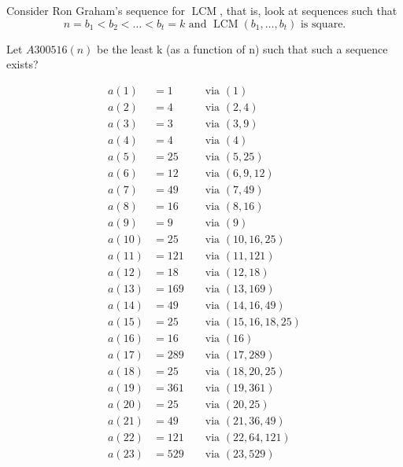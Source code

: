 \documentclass{article}
\begin{document}
Consider Ron Graham's sequence for $\operatorname{LCM}$, that is, look at sequences such that \[
  n = b_1 < b_2 < \hdots < b_t = k \text{ and } \operatorname{LCM}(b_1,\hdots,b_t) \text{ is square.}
\]
\begin{question}
  Let $A300516(n)$ be the least k (as a function of n) such that such a sequence
  exists?
\end{question}
\begin{figure}[h]
  \centering
  \allowdisplaybreaks
  \begin{multicols}{3}
    \noindent
    \begin{alignat*}{2}
      a(1)  &= 1  &&\text{ via } (1)\\
      a(2)  &= 4  &&\text{ via } (2, 4)\\
      a(3)  &= 3  &&\text{ via } (3, 9)\\
      a(4)  &= 4  &&\text{ via } (4)\\
      a(5)  &= 25 &&\text{ via } (5, 25)\\
      a(6)  &= 12 &&\text{ via } (6, 9, 12)\\
      a(7)  &= 49 &&\text{ via } (7, 49)\\
      a(8)  &= 16 &&\text{ via } (8, 16)\\
      a(9)  &= 9  &&\text{ via } (9)\\
      a(10) &= 25 &&\text{ via } (10, 16, 25)\\
      a(11) &= 121 &&\text{ via } (11, 121)\\
      a(12) &= 18  &&\text{ via } (12, 18)\\
      a(13) &= 169 &&\text{ via } (13, 169)\\
      a(14) &= 49  &&\text{ via } (14, 16, 49)\\
      a(15) &= 25  &&\text{ via } (15, 16, 18, 25)\\
      a(16) &= 16  &&\text{ via } (16)\\
      a(17) &= 289 &&\text{ via } (17, 289)\\
      a(18) &= 25  &&\text{ via } (18, 20, 25)\\
      a(19) &= 361 &&\text{ via } (19, 361)\\
      a(20) &= 25  &&\text{ via } (20, 25)\\
      a(21) &= 49  &&\text{ via } (21, 36, 49)\\
      a(22) &= 121 &&\text{ via } (22, 64, 121)\\
      a(23) &= 529 &&\text{ via } (23, 529)\\

\end{alignat*}
\end{multicols}
\end{figure}
\end{document}
